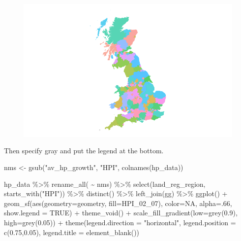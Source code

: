\documentclass[
  letterpaper,
]{book}
\newenvironment{Shaded}{\begin{snugshade}}{\end{snugshade}}
\newcommand{\AttributeTok}[1]{\textcolor[rgb]{0.40,0.45,0.13}{#1}}
\newcommand{\ConstantTok}[1]{\textcolor[rgb]{0.56,0.35,0.01}{#1}}
\newcommand{\DecValTok}[1]{\textcolor[rgb]{0.68,0.00,0.00}{#1}}
\newcommand{\FloatTok}[1]{\textcolor[rgb]{0.68,0.00,0.00}{#1}}
\newcommand{\FunctionTok}[1]{\textcolor[rgb]{0.28,0.35,0.67}{#1}}
\newcommand{\NormalTok}[1]{\textcolor[rgb]{0.00,0.23,0.31}{#1}}
\newcommand{\OtherTok}[1]{\textcolor[rgb]{0.00,0.23,0.31}{#1}}
\newcommand{\SpecialCharTok}[1]{\textcolor[rgb]{0.37,0.37,0.37}{#1}}
\newcommand{\StringTok}[1]{\textcolor[rgb]{0.13,0.47,0.30}{#1}}
\begin{document}
\begin{figure}[H]

{\centering \includegraphics{./Maps_files/figure-pdf/unnamed-chunk-4-1.pdf}

}

\end{figure}

Then specify gray and put the legend at the bottom.

\begin{Shaded}
\begin{Highlighting}[]
\NormalTok{nms }\OtherTok{\textless{}{-}} \FunctionTok{gsub}\NormalTok{(}\StringTok{"av\_hp\_growth"}\NormalTok{, }\StringTok{"HPI"}\NormalTok{, }\FunctionTok{colnames}\NormalTok{(hp\_data))}

\NormalTok{hp\_data }\SpecialCharTok{\%\textgreater{}\%}
  \FunctionTok{rename\_all}\NormalTok{( }\SpecialCharTok{\textasciitilde{}}\NormalTok{ nms) }\SpecialCharTok{\%\textgreater{}\%}
  \FunctionTok{select}\NormalTok{(land\_reg\_region, }\FunctionTok{starts\_with}\NormalTok{(}\StringTok{"HPI"}\NormalTok{)) }\SpecialCharTok{\%\textgreater{}\%}
  \FunctionTok{distinct}\NormalTok{() }\SpecialCharTok{\%\textgreater{}\%}
  \FunctionTok{left\_join}\NormalTok{(gg) }\SpecialCharTok{\%\textgreater{}\%}
  \FunctionTok{ggplot}\NormalTok{() }\SpecialCharTok{+}
  \FunctionTok{geom\_sf}\NormalTok{(}\FunctionTok{aes}\NormalTok{(}\AttributeTok{geometry=}\NormalTok{geometry, }\AttributeTok{fill=}\NormalTok{HPI\_02\_07), }
          \AttributeTok{color=}\ConstantTok{NA}\NormalTok{, }\AttributeTok{alpha=}\NormalTok{.}\DecValTok{66}\NormalTok{, }\AttributeTok{show.legend =} \ConstantTok{TRUE}\NormalTok{) }\SpecialCharTok{+}
  \FunctionTok{theme\_void}\NormalTok{() }\SpecialCharTok{+}
  \FunctionTok{scale\_fill\_gradient}\NormalTok{(}\AttributeTok{low=}\FunctionTok{grey}\NormalTok{(}\FloatTok{0.9}\NormalTok{), }\AttributeTok{high=}\FunctionTok{grey}\NormalTok{(}\FloatTok{0.05}\NormalTok{)) }\SpecialCharTok{+}
  \FunctionTok{theme}\NormalTok{(}\AttributeTok{legend.direction =} \StringTok{"horizontal"}\NormalTok{, }
        \AttributeTok{legend.position  =} \FunctionTok{c}\NormalTok{(}\FloatTok{0.75}\NormalTok{,}\FloatTok{0.05}\NormalTok{),}
        \AttributeTok{legend.title     =} \FunctionTok{element\_blank}\NormalTok{())}
\end{Highlighting}
\end{Shaded}
\end{document}
